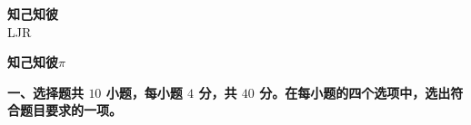\documentclass[11pt,a4paper]{ctexart}
\newcommand{\sectiontitle}[1]{
  \par\noindent\textbf{#1}\par%
  }
\newcounter{chapPage}
\begin{document}
\thispagestyle{empty}
\begin{center}
    \vspace*{\fill}%
    {\Huge\bfseries 知己知彼}\\[1.5cm]%
    {\Large LJR}\\[0.5cm]%
    \vspace*{\fill}
\end{center}
\newpage

\tableofcontents %
\newpage 

\clearpage %
\setcounter{enumi}{0}   %
{} %
\setcounter{chapPage}{1} %

\begin{center} 
    {\LARGE \textbf{知己知彼$\pi$}}\\[1em]
\end{center}

\sectiontitle{一、选择题共 $10$ 小题，每小题 $4$ 分，共 $40$ 分。在每小题的四个选项中，选出符合题目要求的一项。}
\end{document}
